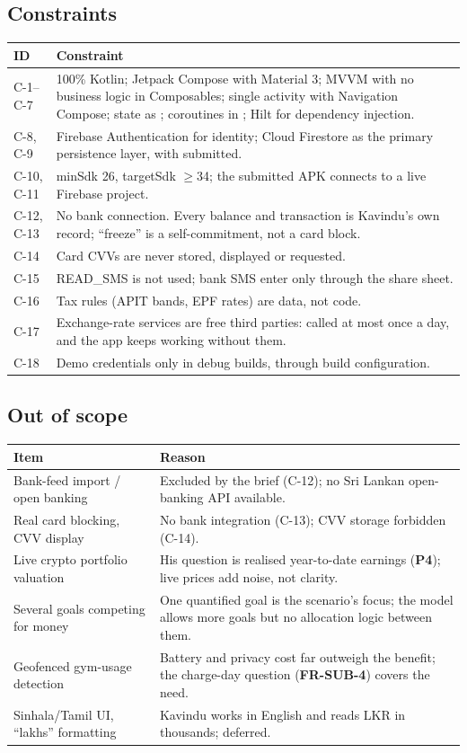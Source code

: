 \documentclass[11pt,a4paper]{article}
\newcommand{\req}[1]{\textsf{\textbf{\color{pfgreendark}#1}}}
\newcommand{\prob}[1]{\textsf{\textbf{\color{pfamberdark}#1}}}
\begin{document}
\subsection{Constraints}
\begin{tabularx}{\textwidth}{|>{\raggedright\arraybackslash}p{1cm}|L|}
\hline
\textbf{ID} & \textbf{Constraint}\\
\hline
C-1--C-7 & 100\% Kotlin; Jetpack Compose with Material 3; MVVM with no business logic in Composables; single activity with Navigation Compose; state as ; coroutines in ; Hilt for dependency injection.\\
C-8, C-9 & Firebase Authentication for identity; Cloud Firestore as the primary persistence layer, with  submitted.\\
C-10, C-11 & minSdk 26, targetSdk $\geq$34; the submitted APK connects to a live Firebase project.\\
C-12, C-13 & No bank connection. Every balance and transaction is Kavindu's own record; ``freeze'' is a self-commitment, not a card block.\\
C-14 & Card CVVs are never stored, displayed or requested.\\
C-15 & READ\_SMS is not used; bank SMS enter only through the share sheet.\\
C-16 & Tax rules (APIT bands, EPF rates) are data, not code.\\
C-17 & Exchange-rate services are free third parties: called at most once a day, and the app keeps working without them.\\
C-18 & Demo credentials only in debug builds, through build configuration.\\
\hline
\end{tabularx}

\subsection{Out of scope}
\begin{tabularx}{\textwidth}{|>{\raggedright\arraybackslash}p{4.6cm}|L|}
\hline
\textbf{Item} & \textbf{Reason}\\
\hline
Bank-feed import / open banking & Excluded by the brief (C-12); no Sri Lankan open-banking API available.\\
Real card blocking, CVV display & No bank integration (C-13); CVV storage forbidden (C-14).\\
Live crypto portfolio valuation & His question is realised year-to-date earnings (\prob{P4}); live prices add noise, not clarity.\\
Several goals competing for money & One quantified goal is the scenario's focus; the model allows more goals but no allocation logic between them.\\
Geofenced gym-usage detection & Battery and privacy cost far outweigh the benefit; the charge-day question (\req{FR-SUB-4}) covers the need.\\
Sinhala/Tamil UI, ``lakhs'' formatting & Kavindu works in English and reads LKR in thousands; deferred.\\
\hline
\end{tabularx}
\end{document}
